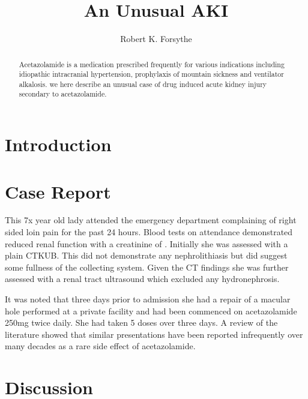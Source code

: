\documentclass[11pt]{article}
\title{An Unusual AKI}
\author{Robert K. Forsythe}
\begin{document}
\maketitle
\begin{abstract}
	Acetazolamide is a medication prescribed frequently for various indications including idiopathic intracranial hypertension, prophylaxis of mountain sickness and ventilator alkalosis. we here describe an unusual case of drug induced acute kidney injury secondary to acetazolamide. 
\end{abstract}

\section*{Introduction}


		
\section*{Case Report}

This 7x year old lady attended the emergency department complaining of right sided loin pain for the past 24 hours. Blood tests on attendance demonstrated reduced renal function with a creatinine of \todo. Initially she was assessed with a plain CTKUB. This did not demonstrate any nephrolithiasis but did suggest some fullness of the collecting system. Given the CT findings she was further assessed with a renal tract ultrasound which excluded any hydronephrosis. 

It was noted that three days prior to admission she had a repair of a macular hole performed at a private facility and had been commenced on acetazolamide 250mg twice daily. She had taken 5 doses over three days. A review of the literature showed that similar presentations have been reported infrequently over many decades as a rare side effect of acetazolamide\cite{Lawson2020}. 



\section*{Discussion}

\printbibliography
\end{document}
